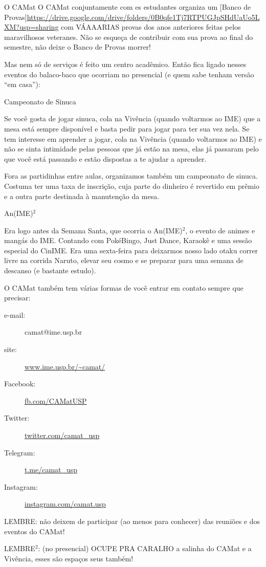\begin{secao}{O CAMat}
O CAMat conjuntamente com es estudantes organiza um
[Banco de Provas]\url{https://drive.google.com/drive/folders/0B0qfe1Tj7RTPUGJpSHdUaUo5LXM?usp=sharing}
com VÁAAARIAS provas dos anos anteriores feitas pelos maravilhosos veteranes.
Não se esqueça de contribuir com sua prova ao final do semestre, não
deixe o Banco de Provas morrer!

  
Mas nem só de serviços é feito um centro acadêmico. Então fica ligado nesses
eventos do balaco-baco que ocorriam no presencial (e quem sabe tenham versão “em casa”):

\begin{subsecao}{Campeonato de Sinuca}

Se você gosta de jogar sinuca, cola na Vivência (quando voltarmos ao IME) que
a mesa está sempre disponível e basta pedir para jogar para ter sua vez nela.
Se tem interesse em aprender a jogar, cola na Vivência (quando voltarmos ao IME)
e não se sinta intimidade pelas pessoas que já estão na mesa, elas já passaram pelo
que você está passando e estão dispostas a te ajudar a aprender.

Fora as partidinhas entre aulas, organizamos também um campeonato de sinuca. Costuma
ter uma taxa de inscrição, cuja parte do dinheiro é revertido em prêmio e a outra parte
destinada à manutenção da mesa.

\end{subsecao}

\begin{subsecao}{An(IME)$^2$}

Era logo antes da Semana Santa, que ocorria o An(IME)$^2$, o evento de animes e
mangás do IME. Contando com PokéBingo, Just Dance, Karaokê e uma sessão especial do CinIME.
Era uma sexta-feira para deixarmos nosso lado otaku correr livre na corrida Naruto,
elevar seu cosmo e se preparar para uma semana de descanso (e bastante estudo).

\end{subsecao}


O CAMat também tem várias formas de você entrar em contato sempre que precisar:

\begin{description}
\item [e-mail:] camat@ime.usp.br
\item [site:] \url{www.ime.usp.br/~camat/}
\item [Facebook:] \url{fb.com/CAMatUSP}
\item [Twitter:] \url{twitter.com/camat_usp}
\item [Telegram:] \url{t.me/camat_usp}
\item [Instagram:] \url{instagram.com/camat.usp}
\end{description}

LEMBRE: não deixem de participar (ao menos para conhecer) das reuniões e dos eventos do CAMat!

LEMBRE$^2$: (no presencial) OCUPE PRA CARALHO a salinha do CAMat e a Vivência,
esses são espaços seus também!

\end{secao}

